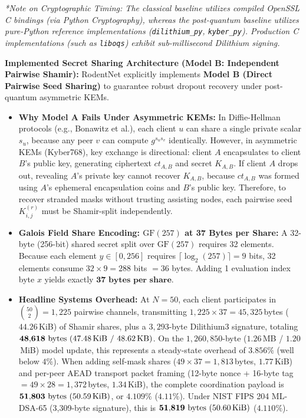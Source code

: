 \documentclass[11pt,a4paper]{report}
\begin{document}
\noindent\small\textit{*Note on Cryptographic Timing: The classical baseline utilizes compiled OpenSSL C bindings (via Python Cryptography), whereas the post-quantum baseline utilizes pure-Python reference implementations (\lstinline|dilithium_py|, \lstinline|kyber_py|). Production C implementations (such as \lstinline|liboqs|) exhibit sub-millisecond Dilithium signing.}

\noindent\textbf{Implemented Secret Sharing Architecture (Model B: Independent Pairwise Shamir):}
RodentNet explicitly implements \textbf{Model B (Direct Pairwise Seed Sharing)} to guarantee robust dropout recovery under post-quantum asymmetric KEMs.
\begin{itemize}[itemsep=2pt]
  \item \textbf{Why Model A Fails Under Asymmetric KEMs:} In Diffie-Hellman protocols (e.g., Bonawitz et al.), each client $u$ can share a single private scalar $s_u$, because any peer $v$ can compute $g^{s_u s_v}$ identically. However, in asymmetric KEMs (Kyber768), key exchange is directional: client $A$ encapsulates to client $B$'s public key, generating ciphertext $ct_{A,B}$ and secret $K_{A,B}$. If client $A$ drops out, revealing $A$'s private key cannot recover $K_{A,B}$, because $ct_{A,B}$ was formed using $A$'s ephemeral encapsulation coins and $B$'s public key. Therefore, to recover stranded masks without trusting assisting nodes, each pairwise seed $K_{i,j}^{(r)}$ must be Shamir-split independently.
  \item \textbf{Galois Field Share Encoding: $\text{GF}(257)$ at 37 Bytes per Share:} A 32-byte (256-bit) shared secret split over $\text{GF}(257)$ requires 32 elements. Because each element $y \in [0, 256]$ requires $\lceil \log_2(257) \rceil = 9$ bits, 32 elements consume $32 \times 9 = 288$ bits $= 36$ bytes. Adding 1 evaluation index byte $x$ yields exactly $\mathbf{37\text{ bytes per share}}$.
  \item \textbf{Headline Systems Overhead:} At $N=50$, each client participates in $\binom{50}{2} = 1{,}225$ pairwise channels, transmitting $1{,}225 \times 37 = 45{,}325$\,bytes ($44.26$\,KiB) of Shamir shares, plus a $3{,}293$-byte Dilithium3 signature, totaling $\mathbf{48{,}618\text{ bytes (47.48\,KiB / 48.62\,KB)}}$. On the $1{,}260{,}850$-byte ($1.26$\,MB / $1.20$\,MiB) model update, this represents a steady-state overhead of $\mathbf{3.856\%}$ (well below $4\%$). When adding self-mask shares ($49 \times 37 = 1{,}813$\,bytes, $1.77$\,KiB) and per-peer AEAD transport packet framing (12-byte nonce + 16-byte tag $= 49 \times 28 = 1{,}372$\,bytes, $1.34$\,KiB), the complete coordination payload is $\mathbf{51{,}803\text{ bytes (50.59\,KiB)}}$, or $\mathbf{4.109\%}$ ($4.11\%$). Under NIST FIPS 204 ML-DSA-65 (3,309-byte signature), this is $\mathbf{51{,}819\text{ bytes (50.60\,KiB)}}$ ($4.110\%$).

\end{itemize}
\end{document}
